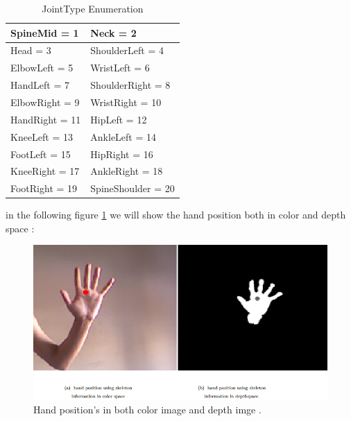 \begin{table}[h!]
\centering

\begin{tabu} to 0.6\textwidth { | X[l] | X[r] | }

 \hline
 SpineMid = 1  & Neck = 2    \\
 \hline 
 Head = 3  &  ShoulderLeft = 4    \\
\hline
  ElbowLeft = 5   &  WristLeft = 6    \\
\hline

 HandLeft =	7  &   ShoulderRight = 8    \\
\hline
 
ElbowRight = 9  &  WristRight = 10   \\
\hline
 
 HandRight = 11  &  HipLeft = 12   \\
\hline
 
 KneeLeft = 13  &  AnkleLeft = 14   \\
\hline
 
FootLeft = 15  &  HipRight = 16   \\
\hline
 
 KneeRight = 17  & AnkleRight = 18     \\
\hline

FootRight = 19   & SpineShoulder = 20     \\

\hline

 \end{tabu}
\caption{JointType Enumeration}
 \label{table:t1} 

 \end{table}

in the following figure \ref{fig:cam9} we will show the hand position both in color and depth space :

\begin{figure}[H]
\centering
\includegraphics[width= 1.0\textwidth]{img/colorvsdepth.PNG}

\caption {Hand position's in both color image and depth imge .
\label{fig:cam9}}

\end{figure}

